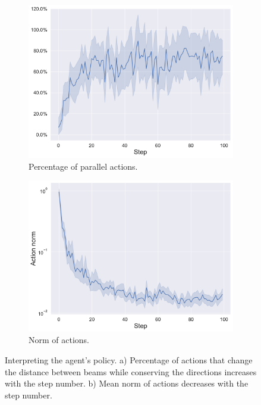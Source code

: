 \begin{figure}[ht]
    \begin{subfigure}[t]{0.5\textwidth}
        \includegraphics[width=\textwidth]{images/parallel_actions_count_for_each_axis.pdf}
        \caption{Percentage of parallel actions.}
        \label{fig:parallel_actions}
    \end{subfigure}
    \quad
    \begin{subfigure}[t]{0.5\textwidth}
        \includegraphics[width=\textwidth]{images/action_norm_decrease.pdf}
        \caption{Norm of actions.}
        \label{fig:act_norm}
    \end{subfigure}
    \caption{Interpreting the agent's policy. a) Percentage of actions that change the distance between beams while conserving the directions increases with the step number. b) Mean norm of actions decreases with the step number.}
     \label{fig:parallel_norm}
\end{figure}
    

